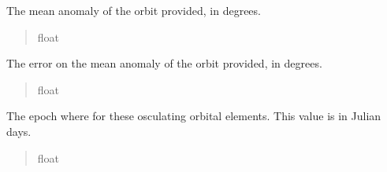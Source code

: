\documentclass[letterpaper,11pt,english]{sphinxmanual}
\begin{document}
\begin{savenotes}
\begin{fulllineitems}

\begin{savenotes}\begin{fulllineitems}
\label{\detokenize{code/opihiexarata.orbit.custom:opihiexarata.orbit.custom.CustomOrbitEngine.mean_anomaly}}
\pysigstartsignatures
{}
\pysigstopsignatures
\sphinxAtStartPar
The mean anomaly of the orbit provided, in degrees.
\begin{quote}\begin{description}
\sphinxAtStartPar
float

\end{description}\end{quote}

\end{fulllineitems}\end{savenotes}


\begin{savenotes}\begin{fulllineitems}
\label{\detokenize{code/opihiexarata.orbit.custom:opihiexarata.orbit.custom.CustomOrbitEngine.mean_anomaly_error}}
\pysigstartsignatures
{}
\pysigstopsignatures
\sphinxAtStartPar
The error on the mean anomaly of the orbit provided, in degrees.
\begin{quote}\begin{description}
\sphinxAtStartPar
float

\end{description}\end{quote}

\end{fulllineitems}\end{savenotes}


\begin{savenotes}\begin{fulllineitems}
\label{\detokenize{code/opihiexarata.orbit.custom:opihiexarata.orbit.custom.CustomOrbitEngine.epoch_julian_day}}
\pysigstartsignatures
{}
\pysigstopsignatures
\sphinxAtStartPar
The epoch where for these osculating orbital elements. This value is
in Julian days.
\begin{quote}\begin{description}
\sphinxAtStartPar
float


\end{description}
\end{quote}
\end{fulllineitems}
\end{savenotes}
\end{fulllineitems}
\end{savenotes}
\end{document}
